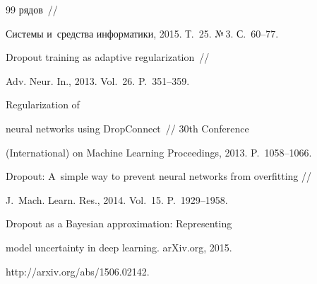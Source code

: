 {{\begin{thebibliography}{99}
рядов~/\!\!/ 


Системы и~средства информатики, 2015. Т.~25. №\,3. С.~60--77.












 Dropout training as adaptive regularization~/\!\!/ 


Adv. Neur. In., 2013. Vol.~26. P.~351--359.















 Regularization of 


neural networks using DropConnect~/\!\!/ 30th Conference 


(International) on Machine Learning Proceedings, 2013. P.~1058--1066.









Dropout: A~simple way to prevent neural networks from overfitting /\!\!/ 


J.~Mach. Learn. Res., 2014. Vol.~15. P.~1929--1958.









 Dropout as a Bayesian approximation: Representing 


model uncertainty in deep learning. arXiv.org, 2015. 


{\sf http://arxiv.org/abs/1506.02142}.










\end{thebibliography}}}
